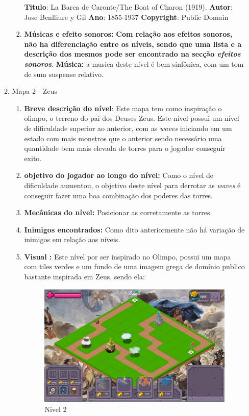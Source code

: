 \documentclass[11pt]{article} %
\begin{document}
\begin{enumerate}
\begin{enumerate}
\begin{enumerate}
			\textbf{Titulo}: La Barca de Caronte/The Boat of Charon (1919).
			\textbf{Autor}: Jose Benlliure y Gil
			\textbf{Ano}: 1855-1937
			\textbf{Copyright}: Public Domain 
			
		\item \textbf{Músicas e efeito sonoros:}
			\textbf{Com relação aos efeitos sonoros, não ha diferenciação entre os níveis, sendo que uma lista e a descrição dos mesmos pode ser encontrado na secção \textit{efeitos sonoros}}.
			\textbf{Música:} a musica deste nível é bem sinfônica, com um tom de sum suspense relativo.
		\end{enumerate}
	\item Mapa 2 - Zeus
		\begin{enumerate}
		\item \textbf{Breve descrição do nível}: Este mapa tem como inspiração o olimpo, o terreno do pai dos Deuses Zeus. Este nível possui um nível de dificuldade superior ao anterior, com as \textit{waves} iniciando em um estado com mais monstros que o anterior sendo necessário uma quantidade bem mais elevada de torres para o jogador conseguir exito. 
		\item \textbf{objetivo do jogador ao longo do nível:} Como o nível de dificuldade aumentou, o objetivo deste nível para derrotar as \textit{waves} é conseguir fazer uma boa combinação dos poderes das torres. 
		\item \textbf{Mecânicas do nível:} Posicionar as corretamente as torres.
		\item \textbf{Inimigos encontrados:} Como dito anteriormente não há variação de inimigos em relação aos níveis.
		\item \textbf{Visual :} Este nível por ser inspirado no Olimpo, possui um mapa com tiles verdes e um fundo de uma imagem grega de domínio publico bastante inspirada em Zeus, sendo ela:
		
			\begin{figure}[!htp]
			\centering
			\includegraphics[scale=0.3]{res/nivel2.png}
			\caption{Nivel 2}
			\label{nivel1}
			\end{figure}
			

\end{enumerate}
\end{enumerate}
\end{enumerate}
\end{document}
